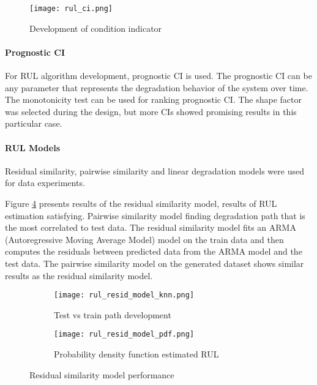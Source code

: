 \begin{figure}[h!]
    \centering
    \texttt{[image: rul\_ci.png]}
    \caption{Development of condition indicator}
    \label{fig:rul_ci}
\end{figure}

\paragraph{Prognostic CI} For RUL algorithm development, prognostic CI is
used. The prognostic CI can be any parameter that represents the
degradation behavior of the system over time. The monotonicity test can be
used for ranking prognostic CI. The shape factor was selected during the
design, but more CIs showed promising results in this particular case.



\paragraph{RUL Models}

Residual similarity, pairwise similarity and linear degradation models were
used for data experiments.


Figure \ref{fig:rul_simil_perfoms} presents results of the residual
similarity model, results of RUL estimation satisfying.  Pairwise
similarity model finding degradation path that is the most correlated to
test data. The residual similarity model fits an ARMA (Autoregressive
Moving Average Model) model on the train data and then computes the
residuals between predicted data from the ARMA model and the test data. The
pairwise similarity model on the generated dataset shows similar results as
the residual similarity model.



\begin{figure}
    \centering
    \begin{subfigure}[b]{0.55\textwidth}
        \centering
        \texttt{[image: rul\_resid\_model\_knn.png]}
        \caption{Test vs train path development}
        \label{fig:rul_path}
    \end{subfigure}
    \hfill
    \begin{subfigure}[b]{0.4\textwidth}
        \centering
        \texttt{[image: rul\_resid\_model\_pdf.png]}
        \caption{Probability density function estimated RUL}
        \label{fig:rul_pdf}
    \end{subfigure}
    \caption{Residual similarity model performance}
    \label{fig:rul_simil_perfoms}
\end{figure}


